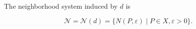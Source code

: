 The neighborhood system induced by $d$ is

$$\mathcal{N} = \mathcal{N}(d) = \{N(P, \varepsilon) \mid P \in X, \varepsilon > 0\}.$$
